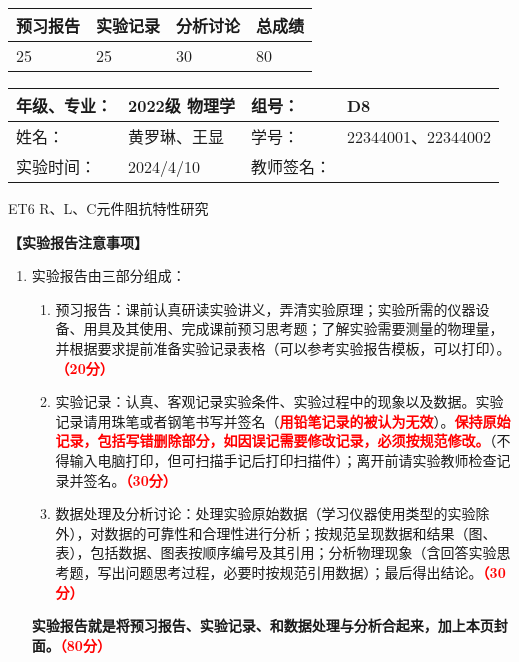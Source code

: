 \documentclass[dvipsnames, svgnames,a4paper,11pt]{article}
\begin{document}
	
	\begin{table}
		\renewcommand\arraystretch{1.7}
		\begin{tabularx}{\textwidth}{
				|X|X|X|X
				|X|X|X|X|}
			\hline
			\multicolumn{2}{|c|}{预习报告}&\multicolumn{2}{|c|}{实验记录}&\multicolumn{2}{|c|}{分析讨论}&\multicolumn{2}{|c|}{总成绩}\\
			\hline
			\LARGE25 & & \LARGE25 & & \LARGE30 & & \LARGE80 & \\
			\hline
		\end{tabularx}
	\end{table}
	
	\begin{table}
		\renewcommand\arraystretch{1.7}
		\begin{tabularx}{\textwidth}{|X|X|X|X|}
			\hline
			年级、专业： & 2022级 物理学 &组号： &D8 \\
			\hline
			姓名： & 黄罗琳、王显   & 学号： &  22344001、22344002 \\
			\hline
			实验时间： & 2024/4/10 & 教师签名： & \\
			\hline
		\end{tabularx}
	\end{table}
	
	\begin{center}
		\LARGE ET6  \quad R、L、C元件阻抗特性研究
	\end{center}
	
	
	\textbf{【实验报告注意事项】}
	\begin{enumerate}
		\item 实验报告由三部分组成：
		\begin{enumerate}
			\item 预习报告：课前认真研读实验讲义，弄清实验原理；实验所需的仪器设备、用具及其使用、完成课前预习思考题；了解实验需要测量的物理量，并根据要求提前准备实验记录表格（可以参考实验报告模板，可以打印）。\textcolor{red}{\textbf{（20分）}}
			\item 实验记录：认真、客观记录实验条件、实验过程中的现象以及数据。实验记录请用珠笔或者钢笔书写并签名（\textcolor{red}{\textbf{用铅笔记录的被认为无效}}）。\textcolor{red}{\textbf{保持原始记录，包括写错删除部分，如因误记需要修改记录，必须按规范修改。}}（不得输入电脑打印，但可扫描手记后打印扫描件）；离开前请实验教师检查记录并签名。\textcolor{red}{\textbf{（30分）}}
			\item 数据处理及分析讨论：处理实验原始数据（学习仪器使用类型的实验除外），对数据的可靠性和合理性进行分析；按规范呈现数据和结果（图、表），包括数据、图表按顺序编号及其引用；分析物理现象（含回答实验思考题，写出问题思考过程，必要时按规范引用数据）；最后得出结论。\textcolor{red}{\textbf{（30分）}}
		\end{enumerate}
		\textbf{实验报告就是将预习报告、实验记录、和数据处理与分析合起来，加上本页封面。\textcolor{red}{（80分）}}
	
	\end{enumerate}
		
\end{document}
